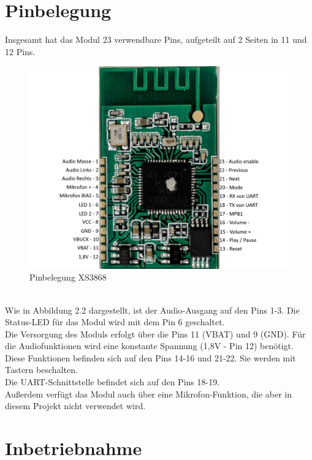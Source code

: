 \section{Pinbelegung}
Insgesamt hat das Modul 23 verwendbare Pins, aufgeteilt auf 2 Seiten in 11 und 12 Pins. 
\begin{figure} [h]
	\centering
	\caption{Pinbelegung XS3868}
	\includegraphics[width=1\textwidth]{img/XS3868_Pinbelegung.png}
\end{figure}\\
Wie in Abbildung 2.2 dargestellt, ist der Audio-Ausgang auf den Pins 1-3. Die Status-LED für das Modul wird mit dem Pin 6 geschaltet.\\
Die Versorgung des Moduls erfolgt über die Pins 11 (VBAT) und 9 (GND). Für die Audiofunktionen wird eine konstante Spannung (1,8V - Pin 12) benötigt. Diese Funktionen befinden sich auf den Pins 14-16 und 21-22. Sie werden mit Tastern beschalten.\\
Die UART-Schnittstelle befindet sich auf den Pins 18-19.\\
Außerdem verfügt das Modul auch über eine Mikrofon-Funktion, die aber in diesem Projekt nicht verwendet wird.

\section{Inbetriebnahme}



